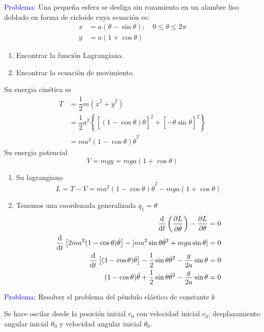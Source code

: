 \documentclass[../main]{subfiles}
\begin{document}
\textcolor{blue}{Problema:} Una pequeña esfera se desliga sin rozamiento en un alambre liso doblado en forma de cicloide cuya ecuación es:
\begin{align*}
    x&=a(\theta-\sin \theta); \quad 0\leq \theta \leq 2\pi\\
    y&=a(1+\cos \theta)
\end{align*}
\begin{enumerate}[label=(\alph*)]
    \item Encontrar la función Lagrangiana.
    \item Encontrar la ecuación de movimiento.
\end{enumerate}
Su energia cinética es
\begin{align*}
    T&=\dfrac{1}{2}m(\dot{x}^2+\dot{y}^2)\\
    &=\dfrac{1}{2}a^2\left\{[(1-\cos \theta)\dot{\theta}]^2+[-\dot{\theta}\sin \theta]^2\right\}\\
    &=ma^2(1-\cos \theta)\dot{\theta}^2
\end{align*}
Su energia potencial
\begin{equation*}
    V=mgy=mga(1+\cos \theta)
\end{equation*}
\begin{enumerate}[label=(\alph*)]
    \item Su lagrangiano 
    \begin{equation*}
        L=T-V=ma^2(1-\cos \theta)\dot{\theta}^2-mga(1+\cos \theta)
    \end{equation*}
    \item Tenemos una coordenada generalizada $q_1=\theta$
    \begin{align*}
        \dv{}{t}\left(\pdv{L}{\dot{\theta}}\right)-\pdv{L}{\theta}&=0 \\
        \dv{}{t}\left[2ma^2(1-\cos \theta)\dot{\theta}\right]-[ma^2\sin \theta \dot{\theta}^2+mga\sin \theta]&=0\\
        \dv{}{t}\left[(1-\cos \theta)\dot{\theta}\right]-\dfrac{1}{2}\sin \theta \dot{\theta}^2-\dfrac{g}{2a}\sin \theta&=0\\
        (1-\cos \theta)\ddot{\theta}+\dfrac{1}{2}\sin \theta \dot{\theta}^2-\dfrac{g}{2a}\sin \theta&=0
    \end{align*}
\end{enumerate}

\textcolor{blue}{Problema:} Resolver el problema del péndulo elástico de constante $k$

Se hace oscilar desde la posición inicial $r_0$ con velocidad inicial $\dot{r}_0$, desplazamiento angular inicial $\theta_0$ y velocidad angular inicial $\dot{\theta}_0$.
\end{document}
